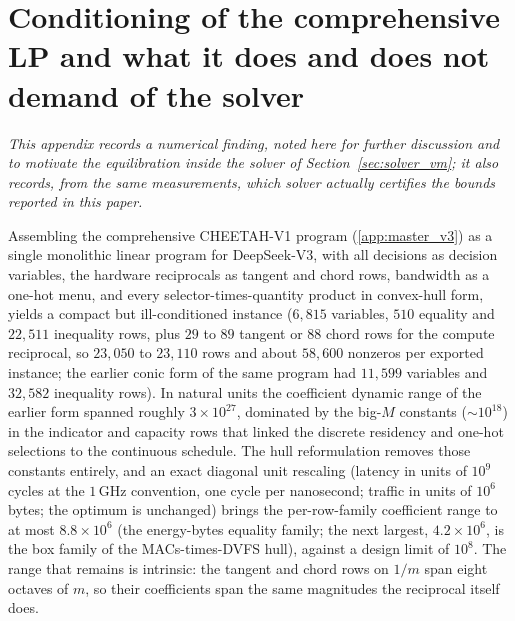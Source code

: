 \section{Conditioning of the comprehensive LP and what it does and does not demand of the solver}
\label{app:socp_conditioning}

\emph{This appendix records a numerical finding, noted here for further
discussion and to motivate the equilibration inside the solver of
Section~\ref{sec:solver_vm}; it also records, from the same measurements, which
solver actually certifies the bounds reported in this paper.}

Assembling the comprehensive CHEETAH-V1 program (\cref{app:master_v3}) as a single
monolithic linear program for DeepSeek-V3, with all decisions as decision
variables, the hardware reciprocals as tangent and chord rows, bandwidth as a
one-hot menu, and every selector-times-quantity product in convex-hull form,
yields a compact but ill-conditioned instance
($6{,}815$ variables, $510$ equality and $22{,}511$ inequality rows, plus
$29$ to $89$ tangent or $88$ chord rows for the compute reciprocal, so
$23{,}050$ to $23{,}110$ rows and about $58{,}600$ nonzeros per exported
instance; the earlier conic form of the same program had $11{,}599$ variables
and $32{,}582$ inequality rows). In natural units the coefficient dynamic range of the earlier
form spanned roughly $3\times10^{27}$, dominated by the big-$M$ constants
($\sim\!10^{18}$) in the indicator and capacity rows that linked the discrete
residency and one-hot selections to the continuous schedule. The hull
reformulation removes those constants entirely, and an exact diagonal unit
rescaling (latency in units of $10^{9}$ cycles at the $1$\,GHz convention,
one cycle per nanosecond; traffic in units of $10^{6}$
bytes; the optimum is unchanged) brings the per-row-family coefficient
range to at most $8.8\times10^{6}$ (the energy-bytes equality family; the
next largest, $4.2\times10^{6}$, is the box family of the MACs-times-DVFS
hull), against a design limit of $10^{8}$. The range that remains is
intrinsic: the tangent and
chord rows on $1/m$ span eight octaves of $m$, so their coefficients span the
same magnitudes the reciprocal itself does.

